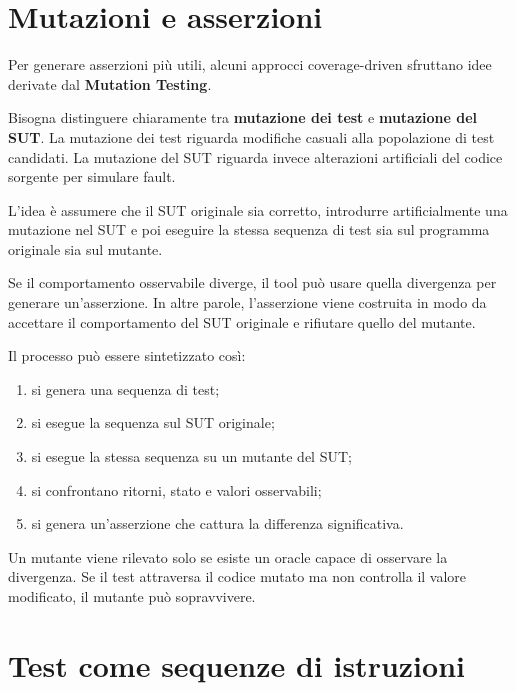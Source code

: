 \section{Mutazioni e asserzioni}

Per generare asserzioni più utili, alcuni approcci coverage-driven sfruttano idee derivate dal \textbf{Mutation Testing}.

\begin{notaesame}
Bisogna distinguere chiaramente tra \textbf{mutazione dei test} e \textbf{mutazione del SUT}. La mutazione dei test riguarda modifiche casuali alla popolazione di test candidati. La mutazione del SUT riguarda invece alterazioni artificiali del codice sorgente per simulare fault.
\end{notaesame}

L'idea è assumere che il SUT originale sia corretto, introdurre artificialmente una mutazione nel SUT e poi eseguire la stessa sequenza di test sia sul programma originale sia sul mutante.

Se il comportamento osservabile diverge, il tool può usare quella divergenza per generare un'asserzione. In altre parole, l'asserzione viene costruita in modo da accettare il comportamento del SUT originale e rifiutare quello del mutante.

Il processo può essere sintetizzato così:

\begin{enumerate}
    \item si genera una sequenza di test;
    \item si esegue la sequenza sul SUT originale;
    \item si esegue la stessa sequenza su un mutante del SUT;
    \item si confrontano ritorni, stato e valori osservabili;
    \item si genera un'asserzione che cattura la differenza significativa.
\end{enumerate}

\begin{notaprof}
Un mutante viene rilevato solo se esiste un oracle capace di osservare la divergenza. Se il test attraversa il codice mutato ma non controlla il valore modificato, il mutante può sopravvivere.
\end{notaprof}

\section{Test come sequenze di istruzioni}

